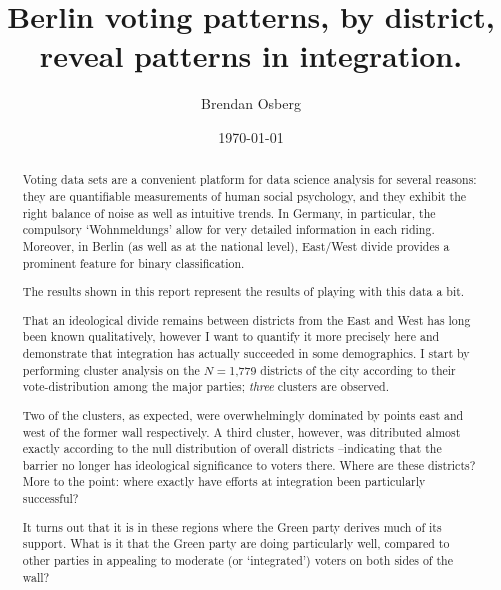 \documentclass[amsmath,amssymb,nofootinbib,12pt,preprint]{revtex4}
\begin{document}
\title{Berlin voting patterns, by district, reveal patterns in integration.   }
\author{Brendan Osberg}

\date{\today}

\begin{abstract}

Voting data sets are a convenient platform for data science analysis for several reasons: they are quantifiable measurements of human social psychology, and they exhibit the right balance of noise as well as intuitive trends. In Germany, in particular, the compulsory `Wohnmeldungs' allow for very detailed information in each riding. Moreover, in Berlin (as well as at the national level), East/West divide provides a prominent feature for binary classification. 

The results shown in this report represent the results of playing with this data a bit.


That an ideological divide remains  between districts from the East and West has long been known qualitatively, however I want to  quantify it more precisely here and demonstrate that integration has actually succeeded in some demographics.
I start by performing cluster analysis on the $N=$1,779 districts of the city according to their vote-distribution among the major parties; \emph{three} clusters are observed. 

Two of the clusters, as expected, were overwhelmingly dominated by points east and west of the former wall respectively. A third cluster, however, was ditributed almost exactly according to the null distribution of overall districts \---indicating that the barrier no longer has ideological significance to voters there. Where are these districts? More to the point: where exactly have efforts at integration been particularly successful? 

It turns out that it is in these regions where the Green party derives much of its support. What is it that the Green party are doing particularly well, compared to other parties in appealing to moderate (or `integrated') voters on both sides of the wall?

\end{abstract}

\maketitle
\end{document}
